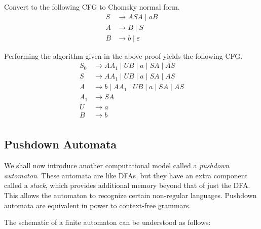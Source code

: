 \begin{exercise}
Convert to the following CFG to Chomsky normal form.
\begin{align*}
    S&\to ASA\mid aB \\
    A&\to B\mid S \\
    B&\to b\mid\varepsilon
\end{align*}
\end{exercise}
\begin{solution}
Performing the algorithm given in the above proof yields the following CFG.
\begin{align*}
    S_0&\to AA_1\mid UB\mid a\mid SA\mid AS \\
    S&\to AA_1\mid UB\mid a\mid SA\mid AS \\
    A&\to b\mid AA_1\mid UB\mid a\mid SA\mid AS \\
    A_1&\to SA \\
    U&\to a \\
    B&\to b \\
\end{align*}
\end{solution}
\clearpage

\subsection{Pushdown Automata}
We shall now introduce another computational model called a \textit{pushdown automaton}. These automata are like DFAs, but they have an extra component called a \textit{stack}, which provides additional memory beyond that of just the DFA. This allows the automaton to recognize certain non-regular languages. Pushdown automata are equivalent in power to context-free grammars. 

The schematic of a finite automaton can be understood as follows:
\begin{center}
\end{center}


